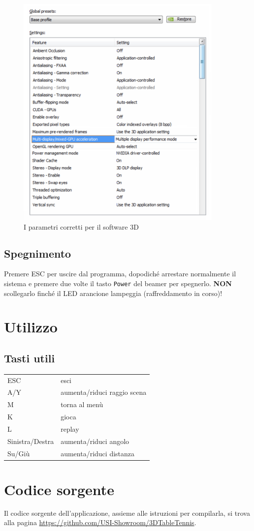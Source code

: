 \documentclass[12pt]{article}
\begin{document}
		\begin{figure}[H]
			\centering
			\includegraphics[width=0.9\textwidth]{img/params.png}
			\caption*{I parametri corretti per il software 3D}
		\end{figure}

	\subsection{Spegnimento}
	
	Premere ESC per uscire dal programma, dopodiché arrestare normalmente il sistema e 
	premere due volte il tasto \texttt{Power} del beamer per spegnerlo. \textbf{NON} scollegarlo finché
	il LED arancione lampeggia (raffreddamento in corso)!
		
		
\section{Utilizzo}

	\subsection{Tasti utili}
	
	\begin{tabular}{l l}
		ESC & esci\\
		A/Y & aumenta/riduci raggio scena\\
		M & torna al menù\\
		K & gioca\\
		L & replay\\
		Sinistra/Destra & aumenta/riduci angolo\\
		Su/Giù & aumenta/riduci distanza\\
	\end{tabular}
		
		
\section{Codice sorgente}

	Il codice sorgente dell'applicazione, assieme alle istruzioni per compilarla, si trova alla pagina \url{https://github.com/USI-Showroom/3DTableTennis}.
		
	
\end{document}
